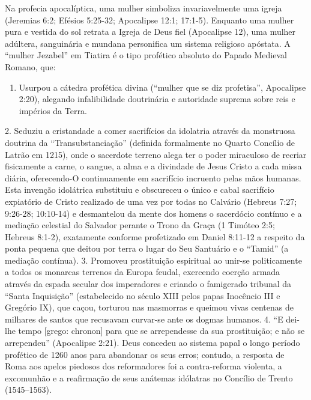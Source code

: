 \documentclass[11pt,a4paper,openany]{book}
\begin{document}
Na profecia apocalíptica, uma mulher simboliza invariavelmente uma igreja (Jeremias 6:2; Efésios 5:25-32; Apocalipse 12:1; 17:1-5). Enquanto uma mulher pura e vestida do sol retrata a Igreja de Deus fiel (Apocalipse 12), uma mulher adúltera, sanguinária e mundana personifica um sistema religioso apóstata. A ``mulher Jezabel'' em Tiatira é o tipo profético absoluto do Papado Medieval Romano, que:
\begin{enumerate}
  \item Usurpou a cátedra profética divina (``mulher que se diz profetisa'', Apocalipse 2:20), alegando infalibilidade doutrinária e autoridade suprema sobre reis e impérios da Terra.
\end{enumerate}

2. Seduziu a cristandade a comer sacrifícios da idolatria através da monstruosa doutrina da ``Transubstanciação'' (definida formalmente no Quarto Concílio de Latrão em 1215), onde o sacerdote terreno alega ter o poder miraculoso de recriar fisicamente a carne, o sangue, a alma e a divindade de Jesus Cristo a cada missa diária, oferecendo-O continuamente em sacrifício incruento pelas mãos humanas. Esta invenção idolátrica substituiu e obscureceu o único e cabal sacrifício expiatório de Cristo realizado de uma vez por todas no Calvário (Hebreus 7:27; 9:26-28; 10:10-14) e desmantelou da mente dos homens o sacerdócio contínuo e a mediação celestial do Salvador perante o Trono da Graça (1 Timóteo 2:5; Hebreus 8:1-2), exatamente conforme profetizado em Daniel 8:11-12 a respeito da ponta pequena que deitou por terra o lugar do Seu Santuário e o ``Tamid'' (a mediação contínua).
3. Promoveu prostituição espiritual ao unir-se politicamente a todos os monarcas terrenos da Europa feudal, exercendo coerção armada através da espada secular dos imperadores e criando o famigerado tribunal da ``Santa Inquisição'' (estabelecido no século XIII pelos papas Inocêncio III e Gregório IX), que caçou, torturou nas masmorras e queimou vivas centenas de milhares de santos que recusavam curvar-se ante os dogmas humanos.
4. ``E dei-lhe tempo [grego: chronon] para que se arrependesse da sua prostituição; e não se arrependeu'' (Apocalipse 2:21). Deus concedeu ao sistema papal o longo período profético de 1260 anos para abandonar os seus erros; contudo, a resposta de Roma aos apelos piedosos dos reformadores foi a contra-reforma violenta, a excomunhão e a reafirmação de seus anátemas idólatras no Concílio de Trento (1545–1563).
\end{document}
